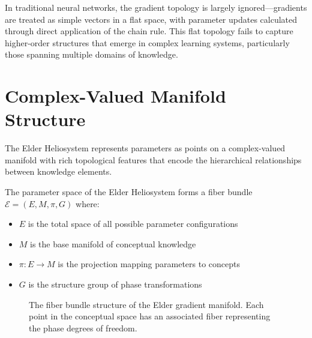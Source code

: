 In traditional neural networks, the gradient topology is largely ignored—gradients are treated as simple vectors in a flat space, with parameter updates calculated through direct application of the chain rule. This flat topology fails to capture higher-order structures that emerge in complex learning systems, particularly those spanning multiple domains of knowledge.

\section{Complex-Valued Manifold Structure}

The Elder Heliosystem represents parameters as points on a complex-valued manifold with rich topological features that encode the hierarchical relationships between knowledge elements.

\begin{theorem}
The parameter space of the Elder Heliosystem forms a fiber bundle $\mathcal{E} = (E, M, \pi, G)$ where:
\begin{itemize}
    \item $E$ is the total space of all possible parameter configurations
    \item $M$ is the base manifold of conceptual knowledge
    \item $\pi: E \rightarrow M$ is the projection mapping parameters to concepts
    \item $G$ is the structure group of phase transformations
\end{itemize}
\end{theorem}

\begin{figure}[ht]
\centering
{}
\caption{The fiber bundle structure of the Elder gradient manifold. Each point in the conceptual space has an associated fiber representing the phase degrees of freedom.}
\label{fig:fiber_bundle}
\end{figure}

